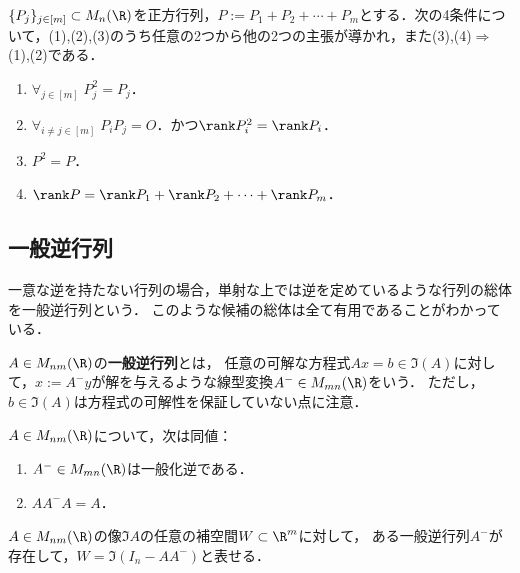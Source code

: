\documentclass[uplatex, dvipdfmx]{jsreport}
\begin{document}
\begin{theorem}
    $\{P_j\}_{j\in[m]}\subset M_n(\R)$を正方行列，$P:=P_1+P_2+\cdots+P_m$とする．次の4条件について，(1),(2),(3)のうち任意の2つから他の2つの主張が導かれ，また(3),(4)$\Rightarrow$(1),(2)である．
    \begin{enumerate}
        \item $\forall_{j\in[m]}\;P_j^2=P_j$．
        \item $\forall_{i\ne j\in[m]}\;P_iP_j=O$．かつ$\rank P_i^2=\rank P_i$．
        \item $P^2=P$．
        \item $\rank P=\rank P_1+\rank P_2+\cdots+\rank P_m$．
    \end{enumerate}
\end{theorem}

\subsection{一般逆行列}

\begin{tcolorbox}[colframe=ForestGreen, colback=ForestGreen!10!white,breakable,colbacktitle=ForestGreen!40!white,coltitle=black,fonttitle=\bfseries\sffamily,
title=]
    一意な逆を持たない行列の場合，単射な上では逆を定めているような行列の総体を一般逆行列という．
    このような候補の総体は全て有用であることがわかっている．
\end{tcolorbox}

\begin{definition}
    $A\in M_{nm}(\R)$の\textbf{一般逆行列}とは，
    任意の可解な方程式$Ax=b\in\Im(A)$に対して，$x:=A^{-}y$が解を与えるような線型変換$A^-\in M_{mn}(\R)$をいう．
    ただし，$b\in\Im(A)$は方程式の可解性を保証していない点に注意．
\end{definition}
\begin{proposition}[一般逆行列の特徴付け]
    $A\in M_{nm}(\R)$について，次は同値：
    \begin{enumerate}
        \item $A^-\in M_{mn}(\R)$は一般化逆である．
        \item $AA^-A=A$．
    \end{enumerate}
\end{proposition}

\begin{theorem}[一般逆行列のGram行列は射影を定める]
    $A\in M_{nm}(\R)$の像$\Im A$の任意の補空間$W\subset\R^m$に対して，
    ある一般逆行列$A^-$が存在して，$W=\Im(I_n-AA^-)$と表せる．
\end{theorem}
\end{document}
